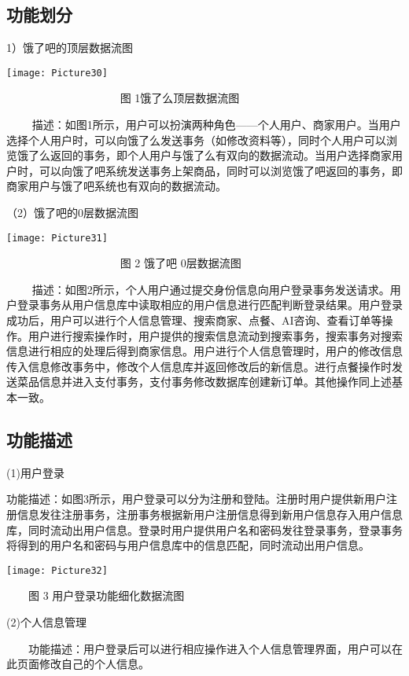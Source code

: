 \subsection{功能划分}

1）饿了吧的顶层数据流图

\texttt{[image: Picture30]}

           图 1饿了么顶层数据流图

  
描述：如图1所示，用户可以扮演两种角色------个人用户、商家用户。当用户选择个人用户时，可以向饿了么发送事务（如修改资料等），同时个人用户可以浏览饿了么返回的事务，即个人用户与饿了么有双向的数据流动。当用户选择商家用户时，可以向饿了吧系统发送事务上架商品，同时可以浏览饿了吧返回的事务，即商家用户与饿了吧系统也有双向的数据流动。

（2）饿了吧的0层数据流图

\texttt{[image: Picture31]}

           图 2 饿了吧 0层数据流图

  
描述：如图2所示，个人用户通过提交身份信息向用户登录事务发送请求。用户登录事务从用户信息库中读取相应的用户信息进行匹配判断登录结果。用户登录成功后，用户可以进行个人信息管理、搜索商家、点餐、AI咨询、查看订单等操作。用户进行搜索操作时，用户提供的搜索信息流动到搜索事务，搜索事务对搜索信息进行相应的处理后得到商家信息。用户进行个人信息管理时，用户的修改信息传入信息修改事务中，修改个人信息库并返回修改后的新信息。进行点餐操作时发送菜品信息并进入支付事务，支付事务修改数据库创建新订单。其他操作同上述基本一致。

\subsection{功能描述}

(1)用户登录

​
功能描述：如图3所示，用户登录可以分为注册和登陆。注册时用户提供新用户注册信息发往注册事务，注册事务根据新用户注册信息得到新用户信息存入用户信息库，同时流动出用户信息。登录时用户提供用户名和密码发往登录事务，登录事务将得到的用户名和密码与用户信息库中的信息匹配，同时流动出用户信息。

\texttt{[image: Picture32]}

  图 3 用户登录功能细化数据流图

(2)个人信息管理

​
  功能描述：用户登录后可以进行相应操作进入个人信息管理界面，用户可以在此页面修改自己的个人信息。

